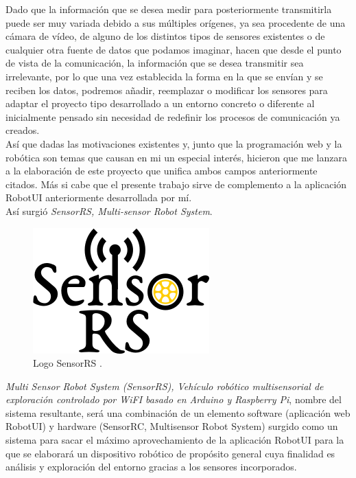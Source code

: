 Dado que la información que se desea medir para posteriormente transmitirla puede ser muy variada debido a sus múltiples orígenes, ya sea procedente de una cámara de vídeo, de 
alguno de los distintos tipos de sensores existentes o de cualquier otra fuente de datos que podamos imaginar, hacen que desde el punto de vista de la comunicación, la información
que se desea transmitir sea irrelevante, por lo que una vez establecida la forma en la que se envían y se reciben  los datos, podremos añadir, reemplazar o modificar los sensores
para adaptar el proyecto tipo desarrollado a un entorno concreto o diferente al inicialmente pensado sin necesidad 
de redefinir los procesos de comunicación ya creados.\\

Así que dadas las motivaciones existentes y, junto que la programación web y la robótica son temas que causan en mi un especial interés, hicieron que me lanzara a la elaboración de este
proyecto que unifica ambos campos anteriormente citados. Más si cabe que el presente trabajo sirve de complemento a la aplicación RobotUI anteriormente desarrollada por mí.\\

Así surgió \emph{SensorRS, Multi-sensor Robot System}.\\

\begin{figure}[H]
  \begin{center}
    \includegraphics[scale=0.8]{imagenes/logotipo_sensor_rs.png}
  \end{center}
  \label{fig:logo}
 \caption{Logo SensorRS \protect\footnotemark.}
\end{figure}


\emph{Multi Sensor Robot System (SensorRS), Vehículo robótico multisensorial de exploración controlado por WiFI basado en Arduino y Raspberry Pi}, nombre del sistema resultante, será una combinación de un elemento software (aplicación web RobotUI) y hardware (SensorRC, Multisensor
Robot System) surgido como un sistema para sacar el máximo aprovechamiento de la aplicación RobotUI para la que se elaborará un dispositivo robótico de propósito general cuya finalidad es
análisis y exploración del entorno gracias a los sensores incorporados.\\

